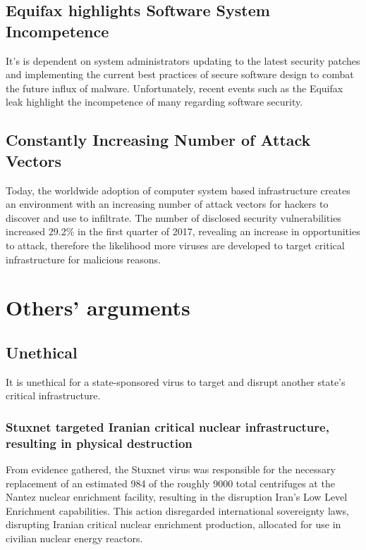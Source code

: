 \documentclass[12pt]{article}
\begin{document}
\begin{multicols}{2}
\subsection{Equifax highlights Software System Incompetence}

It's is dependent on system administrators updating to the latest security patches and implementing the current best practices of secure software design to combat the future influx of malware. Unfortunately, recent events such as the Equifax leak highlight the incompetence of many regarding software security.\cite{equifaxHack}

\subsection{Constantly Increasing Number of Attack Vectors}

Today, the worldwide adoption of computer system based infrastructure creates an environment with an increasing number of attack vectors for hackers to discover and use to infiltrate. The number of disclosed security vulnerabilities increased 29.2\% in the first quarter of 2017, revealing an increase in opportunities to attack, therefore the likelihood more viruses are developed to target critical infrastructure for malicious reasons.\cite{industrialCyberVulnerabilities}

\section{Others' arguments}

\subsection{Unethical}

It is unethical for a state-sponsored virus to target and disrupt another state's critical infrastructure.

\subsubsection{Stuxnet targeted Iranian critical nuclear infrastructure, resulting in physical destruction}

From evidence gathered, the Stuxnet virus was responsible for the necessary replacement of an estimated 984 of the roughly 9000 total centrifuges at the Nantez nuclear enrichment facility, resulting in the disruption Iran's Low Level Enrichment capabilities.\cite{lookIntoIranianNuclearProgram} This action disregarded international sovereignty laws, disrupting Iranian critical nuclear enrichment production, allocated for use in civilian nuclear energy reactors.\cite{internationalSovereigntyDefinition}\footnotemark[2] 


\end{multicols}
\end{document}
